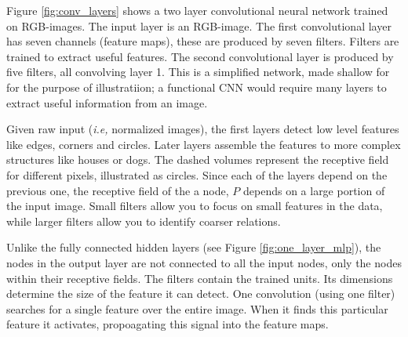 Figure \ref{fig:conv_layers} shows a two layer convolutional neural network trained on RGB-images. The input layer is an RGB-image. The first convolutional layer has seven channels (feature maps), these are produced by seven filters. Filters are trained to extract useful features. The second convolutional layer is produced by five filters, all convolving layer 1. This is a simplified network, made shallow for for the purpose of illustratiion; a functional CNN would require many layers to extract useful information from an image. %

Given raw input (\textit{i.e,} normalized images), the first layers detect low level features like edges, corners and circles. Later layers assemble the features to more complex structures like houses or dogs. The dashed volumes represent the receptive field for different pixels, illustrated as circles. Since each of the layers depend on the previous one, the receptive field of the a node, $P$ depends on a large portion of the input image. Small filters allow you to focus on small features in the data, while larger filters allow you to identify coarser relations.

Unlike the fully connected hidden layers (see Figure \ref{fig:one_layer_mlp}), the nodes in the output layer are not connected to all the input nodes, only the nodes within their receptive fields. The filters contain the trained units. Its dimensions determine the size of the feature it can detect. One convolution (using one filter) searches for a single feature over the entire image. When it finds this particular feature it activates, propoagating this signal into the feature maps.


